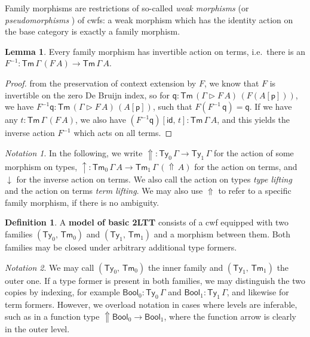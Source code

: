 \documentclass[12pt,a4paper,twoside,openany]{book}
\theoremstyle{remark}
\newtheorem{notation}{Notation}
\theoremstyle{definition}
\newtheorem{mydefinition}{Definition}
\newtheorem{mylemma}{Lemma}
\newcommand{\ms}[1]{\mathsf{#1}}
\newcommand{\id}{\mathsf{id}}
\newcommand{\Tm}{\mathsf{Tm}}
\newcommand{\Ty}{\mathsf{Ty}}
\newcommand{\Lift}{\Uparrow}
\newcommand{\ext}{\triangleright}
\newcommand{\p}{\mathsf{p}}
\newcommand{\q}{\mathsf{q}}
\newcommand{\Bool}{\ms{Bool}}
\newcommand{\up}{\uparrow}
\newcommand{\down}{\downarrow}
\begin{document}
Family morphisms are restrictions of so-called \emph{weak morphisms}
\cite{dependentrightadjoints} (or \emph{pseudomorphisms}
\cite{kaposi2019gluing}) of cwfs: a weak morphism which has the identity action
on the base category is exactly a family morphism.

\begin{mylemma} Every family morphism has invertible action on terms, i.e.\ there
  is an $F^{-1} : \Tm\,\Gamma\,(F\,A) \to \Tm\,\Gamma\,A$.
\end{mylemma}

\begin{proof}
from the preservation of context extension by $F$, we know that $F$ is
invertible on the zero De Bruijn index, so for $\q : \Tm\,(\Gamma \ext F\,A)\,(F
(A[\p]))$, we have $F^{-1}\q : \Tm\,(\Gamma \ext F\,A)\,(A[\p])$, such that $F
(F^{-1}\,\q) = \q$. If we have any $t : \Tm\,\Gamma\,(F\,A)$, we also have
$(F^{-1}\q)[\id,\,t] : \Tm\,\Gamma\,A$, and this yields the inverse action
$F^{-1}$ which acts on all terms.
\end{proof}

\begin{notation}
In the following, we write $\Lift : \Ty_0\,\Gamma \to \Ty_1\,\Gamma$ for
the action of some morphism on types, $\up : \Tm_0\,\Gamma\,A \to
\Tm_1\,\Gamma\,(\Lift\,A)$ for the action on terms, and $\down$ for the inverse
action on terms. We also call the action on types \emph{type lifting}
and the action on terms \emph{term lifting}. We may also use $\Lift$ to
refer to a specific family morphism, if there is no ambiguity.
\end{notation}

\begin{mydefinition}
A \textbf{model of basic 2LTT} consists of a cwf equipped with two families
$(\Ty_0,\,\Tm_0)$ and $(\Ty_1,\,\Tm_1)$ and a morphism between them. Both
families may be closed under arbitrary additional type formers.
\end{mydefinition}

\begin{notation}
We may call $(\Ty_0,\,\Tm_0)$ the inner family and $(\Ty_1,\,\Tm_1)$ the outer
one. If a type former is present in both families, we may distinguish the two
copies by indexing, for example $\Bool_0 : \Ty_0\,\Gamma$ and $\Bool_1 :
\Ty_1\,\Gamma$, and likewise for term formers. However, we overload notation in
cases where levels are inferable, such as in a function type $\Lift\Bool_0 \to
\Bool_1$, where the function arrow is clearly in the outer level.
\end{notation}
\end{document}
